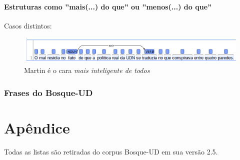 \documentclass[output=paper,colorlinks,citecolor=brown]{langscibook}
\begin{document}
\subsubsection{Estruturas como ''mais(...) do que'' ou ''menos(...) do que''}


Casos distintos:

\begin{figure}
    \centering
    \includegraphics[width=\textwidth,height=\textheight,keepaspectratio]{imagesDrive/image27.png}
    \caption{Martin é o cara \emph{mais inteligente de todos}}
    \label{fig:comparative2}
\end{figure}{}


\subsection{Frases do Bosque-UD}


\chapter*{Apêndice}

	Todas as listas são retiradas do corpus Bosque-UD em sua versão 2.5.
\end{document}
